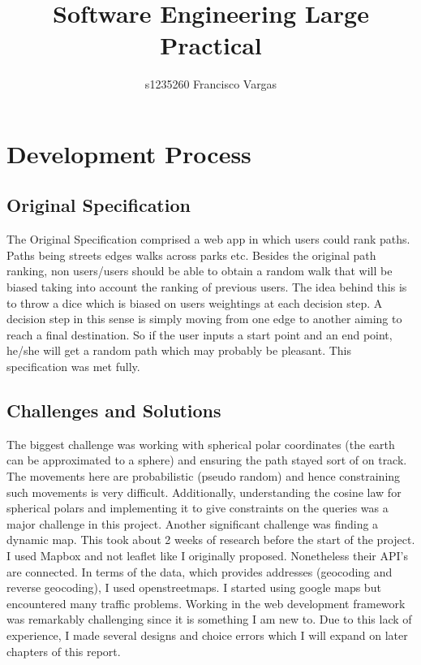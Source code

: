 \documentclass[11pt]{article}
\begin{document}
 


\title{Software Engineering Large Practical}
\author{s1235260 Francisco Vargas}
\maketitle

\section{Development Process}
\subsection{Original Specification}
The Original Specification comprised a web app in which users could rank paths. Paths being streets edges walks across parks etc. Besides the original path ranking, non users/users should be able to obtain a random walk that will be biased 
taking into account the ranking of previous users. The idea behind this is to throw a dice which is biased on users weightings at each decision step. A decision step in this sense is simply moving from one edge to another aiming to reach a final destination. So if the user inputs a start point and an end point, he/she will get a random path which may probably be pleasant. This specification was met fully.
\subsection{Challenges and Solutions} 
The biggest challenge was working with spherical polar coordinates (the earth can be approximated
to a sphere) and ensuring the path stayed sort of on track. The movements here are probabilistic (pseudo random) and hence constraining such movements is very difficult. Additionally, understanding the cosine law for spherical polars and implementing it to give constraints on the queries was a major challenge in this project.
\newline
\newline
Another significant challenge was finding a dynamic map. This took about 2 weeks of research before the start of the project. I used Mapbox and not leaflet like I originally proposed. Nonetheless their API's are connected. In terms of the data, which provides addresses (geocoding and reverse geocoding), I used openstreetmaps. I started using google maps but encountered many traffic problems.
\newline
\newline
Working in the web development framework was remarkably challenging since it is something I am new to. Due to this lack of experience, I made several designs and choice errors which I will expand on later chapters of this report.
\end{document}
